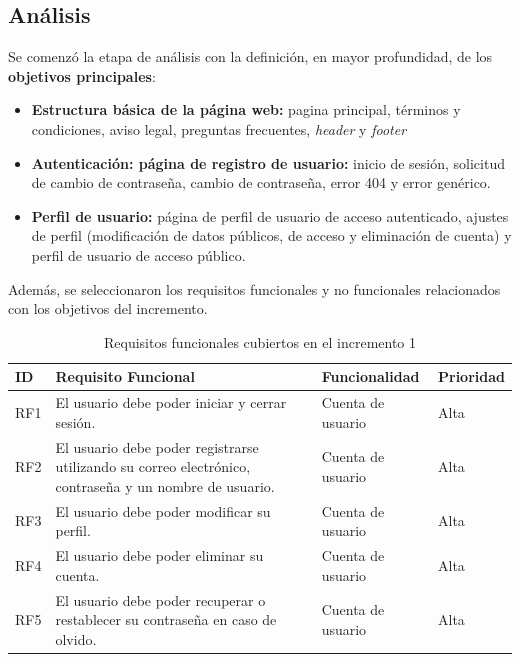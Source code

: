 \subsection{Análisis}
Se comenzó la etapa de análisis con la definición, en mayor profundidad, de los \textbf{objetivos principales}:

\begin{itemize}
    \item \textbf{Estructura básica de la página web:} pagina principal, términos y condiciones, aviso legal, preguntas frecuentes, \textit{header} y \textit{footer}
    \item \textbf{Autenticación: página de registro de usuario:} inicio de sesión, solicitud de cambio de contraseña, cambio de contraseña, error 404 y error genérico.
    \item \textbf{Perfil de usuario:} página de perfil de usuario de acceso autenticado, ajustes de perfil (modificación de datos públicos, de acceso y eliminación de cuenta) y perfil de usuario de acceso público.
\end{itemize}

Además, se seleccionaron los requisitos funcionales  y no funcionales  relacionados con los objetivos del incremento.

\begin{table}[H]
    \centering
    \scriptsize
    \begin{tabular}{l p{} p{} l}
        \textbf{ID} & \textbf{Requisito Funcional} & \textbf{Funcionalidad} & \textbf{Prioridad} \\ \hline
        RF1  & El usuario debe poder iniciar y cerrar sesión. & Cuenta de usuario & Alta \\ \hline
        RF2  & El usuario debe poder registrarse utilizando su correo electrónico, contraseña y un nombre de usuario. & Cuenta de usuario & Alta \\ \hline
        RF3  & El usuario debe poder modificar su perfil. & Cuenta de usuario & Alta \\ \hline
        RF4  & El usuario debe poder eliminar su cuenta. & Cuenta de usuario & Alta \\ \hline
        RF5  & El usuario debe poder recuperar o restablecer su contraseña en caso de olvido. & Cuenta de usuario & Alta \\ \hline
    \end{tabular}
    \caption{Requisitos funcionales cubiertos en el incremento 1}\label{tab:requisitosfuncionalesincremento1}
\end{table}

